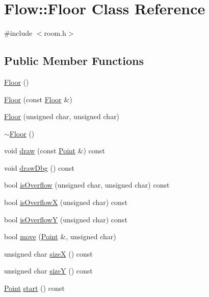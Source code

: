 \hypertarget{class_flow_1_1_floor}{}\section{Flow\+:\+:Floor Class Reference}
\label{class_flow_1_1_floor}


{\ttfamily \#include $<$room.\+h$>$}

\subsection*{Public Member Functions}
\begin{DoxyCompactItemize}
\item 
\hyperlink{class_flow_1_1_floor_a056779b11b4084e15cc7c376f791a8f3}{Floor} ()
\item 
\hyperlink{class_flow_1_1_floor_ab4003203c3ad5de4c13d669bddbb0df5}{Floor} (const \hyperlink{class_flow_1_1_floor}{Floor} \&)
\item 
\hyperlink{class_flow_1_1_floor_afc7d87d65bc697a8901ad9506bafb5b9}{Floor} (unsigned char, unsigned char)
\item 
\hyperlink{class_flow_1_1_floor_abcb53e88835e043390289c0aac035ac0}{$\sim$\+Floor} ()
\item 
void \hyperlink{class_flow_1_1_floor_a7fedee1db9c05420cc75bee81c3be0b6}{draw} (const \hyperlink{struct_flow_1_1_point}{Point} \&) const
\item 
void \hyperlink{class_flow_1_1_floor_a9cab7af772e3b3a12f289b0942e870f1}{draw\+Dbg} () const
\item 
bool \hyperlink{class_flow_1_1_floor_a649041679a73f38cf92ef7082c885795}{is\+Overflow} (unsigned char, unsigned char) const
\item 
bool \hyperlink{class_flow_1_1_floor_a6511d441ffd99d0a0d85669cfa846945}{is\+OverflowX} (unsigned char) const
\item 
bool \hyperlink{class_flow_1_1_floor_aae39e73db09b3b26d17dfda7418a67d1}{is\+OverflowY} (unsigned char) const
\item 
bool \hyperlink{class_flow_1_1_floor_a257b06bf103cca41a2b6e42692fb4fbe}{move} (\hyperlink{struct_flow_1_1_point}{Point} \&, unsigned char)
\item 
unsigned char \hyperlink{class_flow_1_1_floor_ad56ae970e75d1be616164efd2f84125b}{sizeX} () const
\item 
unsigned char \hyperlink{class_flow_1_1_floor_a6b25e8faedfd7de16efea8523c45794c}{sizeY} () const
\item 
\hyperlink{struct_flow_1_1_point}{Point} \hyperlink{class_flow_1_1_floor_aaac7f88dd55b4fe38ba36f686109fe7b}{start} () const

\end{DoxyCompactItemize}
